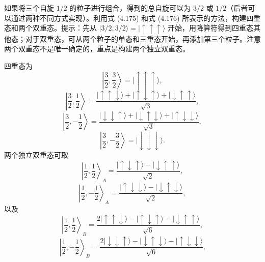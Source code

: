 \begin{question}
如果将三个自旋 $1/2$ 的粒子进行组合，得到的总自旋可以为 $3/2$ 或 $1/2$（后者可以通过两种不同方式实现）。利用式 (4.175) 和式 (4.176) 所表示的方法，构建四重态和两个双重态。提示：先从 $|3/2,3/2\rangle=|\uparrow\uparrow\uparrow\rangle$ 开始，用降算符得到四重态其他态；对于双重态，可从两个粒子的单态和三重态开始，再添加第三个粒子。注意两个双重态不是唯一确定的，重点是构建两个独立双重态。

\par\smallskip
{}

\end{question}
\begin{solution}

四重态为
\[
\left|\frac32,\frac32\right\rangle=|\uparrow\uparrow\uparrow\rangle,
\]
\[
\left|\frac32,\frac12\right\rangle=\frac{|\uparrow\uparrow\downarrow\rangle+|\uparrow\downarrow\uparrow\rangle+|\downarrow\uparrow\uparrow\rangle}{\sqrt3},
\]
\[
\left|\frac32,-\frac12\right\rangle=\frac{|\downarrow\downarrow\uparrow\rangle+|\downarrow\uparrow\downarrow\rangle+|\uparrow\downarrow\downarrow\rangle}{\sqrt3},
\]
\[
\left|\frac32,-\frac32\right\rangle=|\downarrow\downarrow\downarrow\rangle.
\]
两个独立双重态可取
\[
\left|\frac12,\frac12\right\rangle_A=\frac{|\uparrow\downarrow\uparrow\rangle-|\downarrow\uparrow\uparrow\rangle}{\sqrt2},
\]
\[
\left|\frac12,-\frac12\right\rangle_A=\frac{|\uparrow\downarrow\downarrow\rangle-|\downarrow\uparrow\downarrow\rangle}{\sqrt2},
\]
以及
\[
\left|\frac12,\frac12\right\rangle_B=\frac{2|\uparrow\uparrow\downarrow\rangle-|\uparrow\downarrow\uparrow\rangle-|\downarrow\uparrow\uparrow\rangle}{\sqrt6},
\]
\[
\left|\frac12,-\frac12\right\rangle_B=\frac{2|\downarrow\downarrow\uparrow\rangle-|\downarrow\uparrow\downarrow\rangle-|\uparrow\downarrow\downarrow\rangle}{\sqrt6}.
\]

\end{solution}

